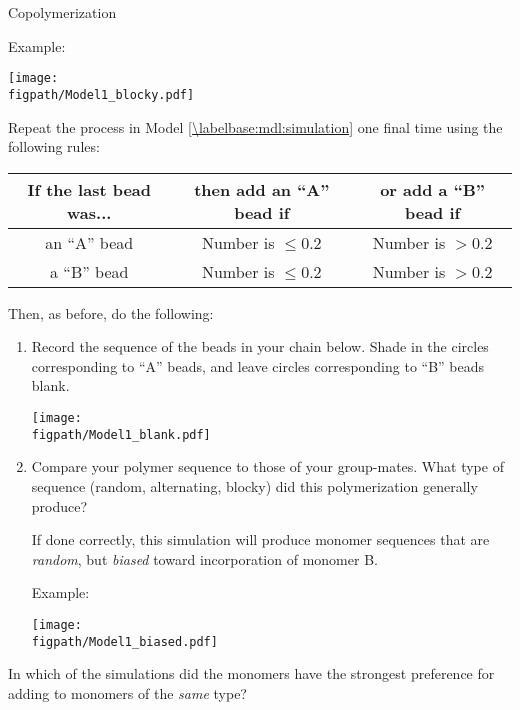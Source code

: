 \begin{activity}{Copolymerization}
\begin{ctqs}
\begin{enumerate}
\begin{solution}[1.5in]{}
			Example:
			
				\centerline{\texttt{[image: \\figpath/Model1\_blocky.pdf]}}
				\end{solution}
		\end{enumerate}
		
	\question \label{\labelbase:ctq:sim-biased} Repeat the process in Model \ref{\labelbase:mdl:simulation} one final time using the following rules:	\begin{center}
					\renewcommand{\arraystretch}{1.5}
					\begin{tabular}{|c|c|c|}
						\hline
						\textbf{If the last bead was...} &  \textbf{then add an ``A'' bead if} & \textbf{or add a ``B'' bead if}\\\hline
						 an ``A'' bead & Number is $\leq 0.2$ & Number is $> 0.2$ \\\hline
						 a ``B'' bead & Number is $\leq 0.2$ & Number is $> 0.2$ \\\hline
					\end{tabular}
					\end{center}
	
		Then, as before, do the following:
		\begin{enumerate}
			\item Record the sequence of the beads in your chain below.  Shade in the circles corresponding to ``A'' beads, and leave circles corresponding to ``B'' beads blank.
	
		\vspace{6pt}
		\centerline{\texttt{[image: \\figpath/Model1\_blank.pdf]}}
	
			\item Compare your polymer sequence to those of your group-mates.  What type of sequence (random, alternating, blocky) did this polymerization generally produce?
			
				\begin{solution}[1.25in]{}
					If done correctly, this simulation will produce monomer sequences that are \emph{random}, but \emph{biased} toward incorporation of monomer B.
			
			Example:
			
				\centerline{\texttt{[image: \\figpath/Model1\_biased.pdf]}}
				\end{solution}
		\end{enumerate}
		
	\question In which of the simulations did the monomers have the strongest preference for adding to monomers of the \emph{same} type?
	

\end{ctqs}
\end{activity}
